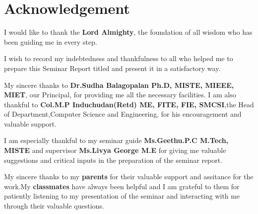 \chapter*{Acknowledgement}
%
I would like to thank the {\bf Lord Almighty}, the foundation of all wisdom who has been guiding me in every step. 

I wish to record my indebtedness and thankfulness to all who helped me to prepare this Seminar Report titled {\bf \vtitle } and present it in a satisfactory way. 


My sincere thanks to {\bf Dr.Sudha Balagopalan Ph.D, MISTE, MIEEE, MIET}, our Principal, for providing me all the necessary facilities.
I am also thankful to {\bf Col.M.P Induchudan(Retd) ME, FITE, FIE, SMCSI},the Head of Department,Computer Science and Engineering,
for his encouragement and valuable 
support.

I am especially thankful to my seminar guide {\bf  Ms.Geethu.P.C M.Tech, MISTE} and supervisor {\bf Ms.Livya George M.E} for giving me valuable suggestions and critical inputs in the preparation of the seminar report. 

My sincere thanks to my {\bf parents} for their valuable support and assitance for the work.My {\bf classmates} have always been 
helpful and I am grateful to them for 
patiently listening to  my presentation of the seminar and interacting with me through their valuable questions. 